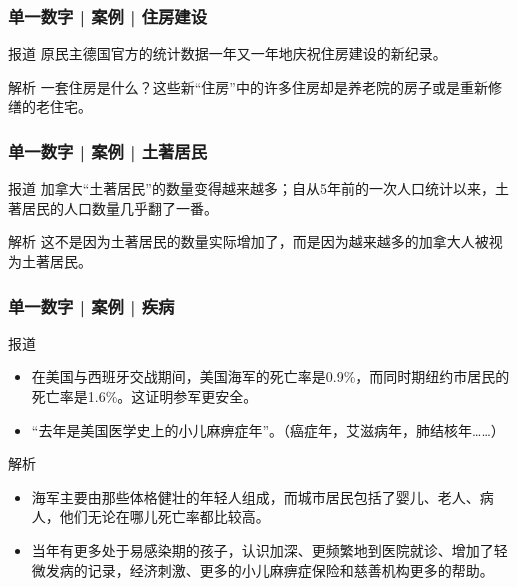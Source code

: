 \begin{frame}
  \frametitle{单一数字 | 案例 | 住房建设}
  \begin{block}{报道}
    原民主德国官方的统计数据一年又一年地庆祝住房建设的新纪录。
  \end{block}
  \pause \pause \pause \pause
  \begin{block}{解析}
    一套住房是什么？这些新“住房”中的许多住房却是养老院的房子或是重新修缮的老住宅。
  \end{block}
\end{frame}

\begin{frame}
  \frametitle{单一数字 | 案例 | 土著居民}
  \begin{block}{报道}
    加拿大“土著居民”的数量变得越来越多；自从5年前的一次人口统计以来，土著居民的人口数量几乎翻了一番。
  \end{block}
  \pause \pause \pause \pause
  \begin{block}{解析}
    这不是因为土著居民的数量实际增加了，而是因为越来越多的加拿大人被视为土著居民。
  \end{block}
\end{frame}

\begin{frame}
  \frametitle{单一数字 | 案例 | 疾病}
  \begin{block}{报道}
    \begin{itemize}
      \item 在美国与西班牙交战期间，美国海军的死亡率是0.9\%，而同时期纽约市居民的死亡率是1.6\%。这证明参军更安全。
      \item “去年是美国医学史上的小儿麻痹症年”。（癌症年，艾滋病年，肺结核年……）
    \end{itemize}
  \end{block}
  \pause \pause \pause \pause
  \begin{block}{解析}
    \begin{itemize}
      \item 海军主要由那些体格健壮的年轻人组成，而城市居民包括了婴儿、老人、病人，他们无论在哪儿死亡率都比较高。
      \item 当年有更多处于易感染期的孩子，认识加深、更频繁地到医院就诊、增加了轻微发病的记录，经济刺激、更多的小儿麻痹症保险和慈善机构更多的帮助。
    \end{itemize}
  \end{block}
\end{frame}

